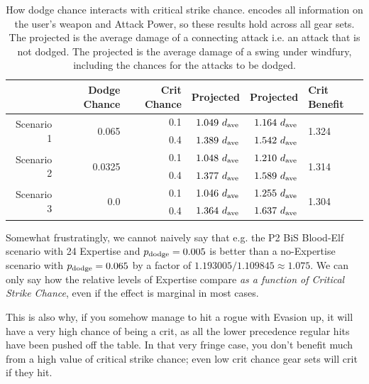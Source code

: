 \begin{table}[htb]
	\centering
	\begin{tabular}{ r | r | r | r | r | l }
		  \multicolumn{1}{c|}{}  & Dodge Chance & Crit Chance & Projected \dphys & Projected \dwf & Crit Benefit \\
		\hline \hline
		\multirow{2}{*}{Scenario 1}	 &	\multirow{2}{*}{0.065} & 0.1 & $1.049~d_{\mathrm{ave}} $ & $1.164~d_{\mathrm{ave}} $ & \multirow{2}{*}{1.324} \\
					&  & 0.4 & $1.389~d_{\mathrm{ave}} $ & $1.542~d_{\mathrm{ave}} $ & \\
		\hline
		
		\multirow{2}{*}{Scenario 2}	 &	\multirow{2}{*}{0.0325} & 0.1 & $1.048~d_{\mathrm{ave}} $ & $1.210~d_{\mathrm{ave}} $ & \multirow{2}{*}{1.314} \\
		&  & 0.4 & $1.377~d_{\mathrm{ave}} $ & $1.589~d_{\mathrm{ave}} $ & \\
		\hline
		
		\multirow{2}{*}{Scenario 3}	 &	\multirow{2}{*}{0.0} & 0.1 & $1.046~d_{\mathrm{ave}} $ & $1.255~d_{\mathrm{ave}} $ & \multirow{2}{*}{1.304} \\
		&  & 0.4 & $1.364~d_{\mathrm{ave}} $ & $1.637~d_{\mathrm{ave}} $ & \\
		\hline
		
	\end{tabular}
	\caption{How dodge chance interacts with critical strike chance.
		\dave encodes all information on the user's weapon and Attack Power, so these results hold across all gear sets.
	The projected \dphys is the average damage of a connecting attack i.e. an attack that is not dodged.
	The projected \dwf is the average damage of a swing under windfury, including the chances for the attacks to be dodged.}		
	\label{tab:wfautos}
\end{table}

Somewhat frustratingly, we cannot naively say that e.g. the P2 BiS Blood-Elf scenario with 24 Expertise and $p_{\mathrm{dodge}}  = 0.005$ is better than a no-Expertise scenario with $p_{\mathrm{dodge}}  = 0.065$ by a factor of $1.193005/1.109845 \approx 1.075$.
We can only say how the relative levels of Expertise compare \emph{as a function of Critical Strike Chance}, even if the effect is marginal in most cases.

This is also why, if you somehow manage to hit a rogue with Evasion up, it will have a very high chance of being a crit, as all the lower precedence regular hits have been pushed off the table.
In that very fringe case, you don't benefit much from a high value of critical strike chance; even low crit chance gear sets will crit if they hit.

